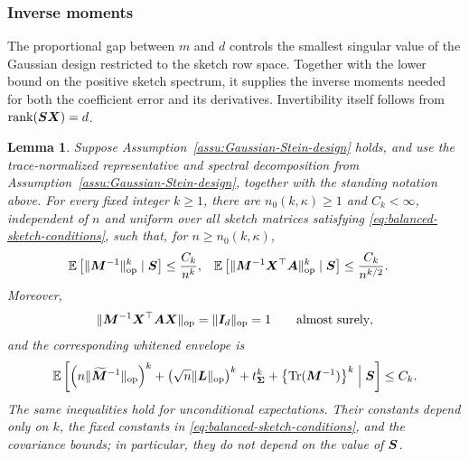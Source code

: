 \documentclass{article}
\theoremstyle{plain} %
\newtheorem{lemma}[theorem]{Lemma}
\theoremstyle{definition} %
\theoremstyle{definition} %
\begin{document}
\subsubsection{Inverse moments}

The proportional gap between $m$ and $d$ controls the smallest singular
value of the Gaussian design restricted to the sketch row space.  Together
with the lower bound on the positive sketch spectrum, it supplies the
inverse moments needed for both the coefficient error and its derivatives.
Invertibility itself follows from $\operatorname{rank}(\boldsymbol{S}\boldsymbol{X})=d$.

\begin{lemma}
\label{lem:M-inverse-bound}
Suppose Assumption~\ref{assu:Gaussian-Stein-design} holds, and use the
trace-normalized
representative and spectral decomposition from
Assumption~\ref{assu:Gaussian-Stein-design}, together with the standing
notation above.
For every fixed integer $k\geq1$, there are $n_0(k,\kappa)\geq1$ and
$C_k<\infty$, independent of $n$ and uniform over all sketch matrices
satisfying \eqref{eq:balanced-sketch-conditions}, such that, for
$n\geq n_0(k,\kappa)$,
\begin{align}
    {\mathbb{E}}\left[\lVert\boldsymbol{M}^{-1}\rVert_{\rm op}^k\mid\boldsymbol{S}\right]
    &\leq \frac{C_k}{n^k},
    &
    {\mathbb{E}}\left[\lVert\boldsymbol{M}^{-1}\boldsymbol{X}^\top\boldsymbol{A}\rVert_{\rm op}^k\mid\boldsymbol{S}\right]
    &\leq \frac{C_k}{n^{k/2}}.
    \label{eq:M-inverse-moments}
\end{align}
Moreover,
\begin{align}
    \lVert\boldsymbol{M}^{-1}\boldsymbol{X}^\top\boldsymbol{A}\boldsymbol{X}\rVert_{\rm op}
    =\lVert\boldsymbol{I}_d\rVert_{\rm op}=1
    \qquad\text{almost surely},
    \label{eq:M-inverse-normal-equation}
\end{align}
and the corresponding whitened envelope is
\begin{align}
    {\mathbb{E}}\left[
       \left(n\lVert\widetilde{\boldsymbol{M}}^{-1}\rVert_{\rm op}\right)^k
       +\left(\sqrt n\lVert\boldsymbol{L}\rVert_{\rm op}\right)^k
       +t_{\boldsymbol{\Sigma}}^k
       +\left\{\operatorname{Tr}(\boldsymbol{M}^{-1})\right\}^k
       \mathrel{\Big|}\boldsymbol{S}
    \right]
    \leq C_k.
    \label{eq:M-inverse-whitened-envelope}
\end{align}
The same inequalities hold for unconditional expectations.  Their constants
depend only on $k$, the fixed constants in
\eqref{eq:balanced-sketch-conditions}, and the covariance bounds; in
particular, they do not depend on the value of $\boldsymbol{S}$.
\end{lemma}
\end{document}
